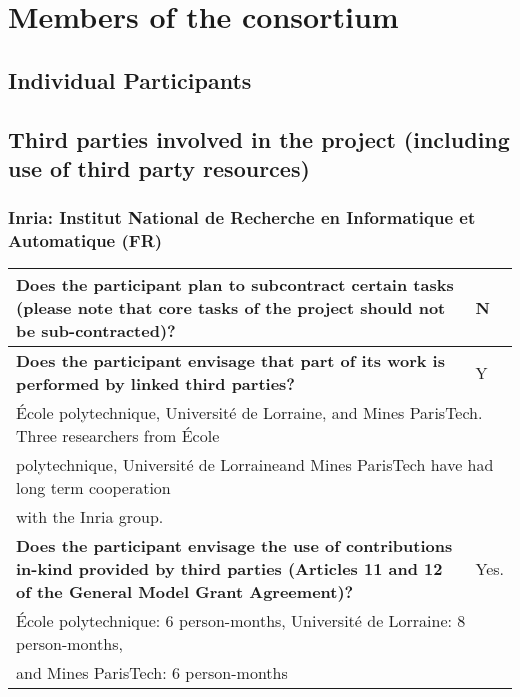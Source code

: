\chapter{Members of the consortium}

\section{Individual Participants}
\label{sec:partners}






























\section{Third parties involved in the project (including use of third party resources)}

\subsection{Inria: Institut National de Recherche en Informatique et
  Automatique (FR)}

\begin{longtable}{|p{}|p{}|}
\hline
{\bf Does the participant plan to subcontract certain tasks (please
  note that core tasks of the project should not be sub-contracted)?}
&
N
\\
\hline
{\bf Does the participant envisage that  part of its work is performed
  by linked third parties?}
&
Y
\\
\hline
\multicolumn{2}{|l|}{
  École polytechnique, Université de Lorraine, and Mines ParisTech.
  Three researchers from École}\\
\multicolumn{2}{|l|}{
  polytechnique, Université de Lorraineand  Mines ParisTech   have had long term cooperation}\\
\multicolumn{2}{|l|}{
  with the Inria group.}
\\
\hline
{\bf Does the participant envisage the use of contributions in-kind
provided by third parties (Articles 11 and 12 of the General Model
Grant Agreement)?}
&
Yes. 
\\
\hline
\multicolumn{2}{|l|}{
École polytechnique: 6 person-months, 
Université de Lorraine: 8 person-months,}
\\
\multicolumn{2}{|l|}{
and Mines ParisTech: 6 person-months}
\\
\hline
\end{longtable}

